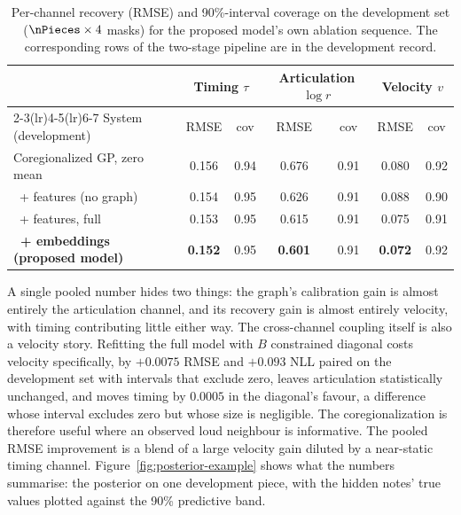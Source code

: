 \begin{table}[h]\centering
\caption{Per-channel recovery (RMSE) and 90\%-interval coverage on the
development set ($\nPieces \times 4$ masks) for the proposed model's own
ablation sequence. The corresponding rows of the two-stage pipeline are in
the development record.}
\label{tab:perchannel}
\footnotesize
\begin{tabular}{@{}lcccccc@{}}
\toprule
 & \multicolumn{2}{c}{Timing $\tau$} & \multicolumn{2}{c}{Articulation $\log r$} & \multicolumn{2}{c}{Velocity $v$} \\
\cmidrule(lr){2-3}\cmidrule(lr){4-5}\cmidrule(lr){6-7}
System (development) & RMSE & cov & RMSE & cov & RMSE & cov \\
\midrule
Coregionalized GP, zero mean                  & 0.156 & 0.94 & 0.676 & 0.91 & 0.080 & 0.92 \\
\ + features (no graph)            & 0.154 & 0.95 & 0.626 & 0.91 & 0.088 & 0.90 \\
\ + features, full                 & 0.153 & 0.95 & 0.615 & 0.91 & 0.075 & 0.91 \\
\textbf{\ + embeddings (proposed model)} & \textbf{0.152} & 0.95 & \textbf{0.601} & 0.91 & \textbf{0.072} & 0.92 \\
\bottomrule
\end{tabular}
\end{table}

\noindent A single pooled number hides two things: the graph's calibration
gain is almost entirely the articulation channel, and its recovery gain is
almost entirely velocity, with timing contributing little either way. The
cross-channel coupling itself is also a velocity story. Refitting the full
model with $B$ constrained diagonal costs velocity specifically, by $+0.0075$
RMSE and $+0.093$ NLL paired on the development set with intervals that
exclude zero, leaves articulation statistically unchanged, and moves timing
by $0.0005$ in the diagonal's favour, a difference whose interval excludes
zero but whose size is negligible. The coregionalization is therefore useful
where an observed loud neighbour is informative. The pooled RMSE improvement
is a blend of a large velocity gain diluted by a near-static timing channel.
Figure~\ref{fig:posterior-example} shows what the numbers summarise: the
posterior on one development piece, with the hidden notes' true values
plotted against the 90\% predictive band.


